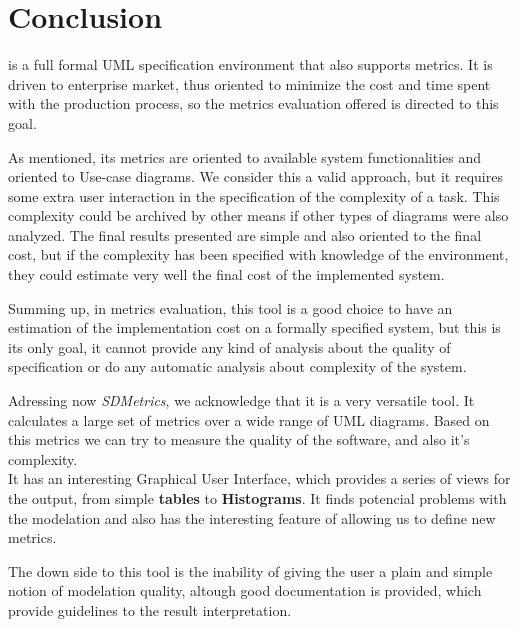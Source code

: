 \section{Conclusion} \label{conc}
\entArch is a full formal UML specification environment that also supports metrics. 
It is driven to enterprise market, thus oriented to minimize the cost and time spent with the production process, so the metrics evaluation offered is directed to this goal.

As mentioned, its metrics are oriented to available system functionalities and oriented to Use-case diagrams. 
We consider this a valid approach, but it requires some extra user interaction in the specification of the complexity of a task.
This complexity could be archived by other means if other types of diagrams were also analyzed.
The final results presented are simple and also oriented to the final cost, but if the complexity has been specified with knowledge of the environment, they could estimate very well the final cost of the implemented system.

Summing up, in metrics evaluation, this tool is a good choice to have an estimation of the implementation cost on a formally specified system, but this is its only goal, it cannot provide any kind of analysis about the quality of specification or do any automatic analysis about complexity of the system.

Adressing now \textit{SDMetrics}, we acknowledge that it is a very versatile tool. It calculates a large set of metrics over a wide range of UML diagrams. Based on this metrics we can try to measure the quality of the software, and also it's complexity.\\
It has an interesting Graphical User Interface, which provides a series of views for the output, from simple \textbf{tables} to \textbf{Histograms}. It finds potencial problems with the modelation and also has the interesting feature of allowing us to define new metrics.

The down side to this tool is the inability of giving the user a plain and simple notion of modelation quality, altough good documentation is provided,  which provide guidelines to the result interpretation.
 

